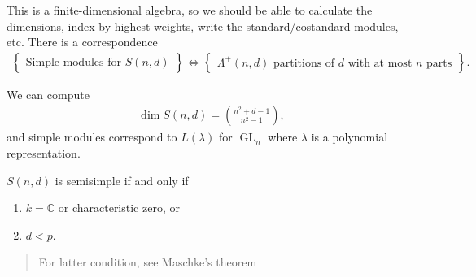 \begin{remark}

This is a finite-dimensional algebra, so we should be able to calculate
the dimensions, index by highest weights, write the standard/costandard
modules, etc. There is a correspondence
\begin{align*} 
\left\{{\substack{\text{Simple modules for }S(n, d)}}\right\}
\iff
\left\{{\substack{\Lambda^+(n, d) \text{ partitions of $d$ with at most $n$ parts}}}\right\}
.\end{align*}

We can compute
\begin{align*}  
\dim S(n, d) = {n^2 + d - 1 \choose n^2 - 1}
,\end{align*}
and simple modules correspond to \(L(\lambda)\) for
\(\operatorname{GL}_n\) where \(\lambda\) is a polynomial
representation.

\end{remark}

\begin{theorem}[?]

\(S(n, d)\) is semisimple if and only if

\begin{enumerate}
\def\labelenumi{\arabic{enumi}.}
\item
  \(k = {\mathbb{C}}\) or characteristic zero, or
\item
  \(d < p\).
\end{enumerate}

\begin{quote}
For latter condition, see Maschke's theorem
\end{quote}

\end{theorem}

